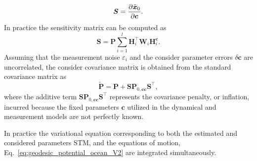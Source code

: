 \documentclass[lineno, pdflatex,sn-mathphys-ay]{sn-jnl}
\theoremstyle{thmstyleone}%
\theoremstyle{thmstyletwo}%
\theoremstyle{thmstylethree}%
\renewcommand{\vec}[1]{\boldsymbol{#1}}
\begin{document}
\begin{equation}
	\vec{S} = \pdv{\tilde{\vec{x}}_{0}}{\vec{c}}.
\end{equation}
In practice the sensitivity matrix can be computed as 
\begin{equation}
    \vec{S} = \vec{P} \sum_{i=1}^{l} \vec{H}_{i}^\top \vec{W}_i \vec{H}_{i}^{\vec{c}}.
\end{equation}
%
Assuming that the measurement noise $\varepsilon_i$ and the consider parameter errors $\delta\vec{c}$ are uncorrelated, the consider covariance matrix is obtained from the standard covariance matrix as
\begin{equation}
    \tilde{\vec{P}} = \vec{P} + \vec{S} \vec{P}_{0,\vec{c}\vec{c}} \vec{S}^\top,
\end{equation}
%
where the additive term $\vec{S}  \vec{P}_{0,\vec{c}\vec{c}} \vec{S}^\top$ represents the covariance penalty, or inflation, incurred because the fixed parameters $\vec{c}$ utilized in the dynamical and measurement models are not perfectly known.


In practice the variational equation corresponding to both the estimated and considered parameters STM, and the equations of motion, Eq.~\eqref{eq:geodesic_potential_ocean_V2} are integrated simultaneously.


\end{document}
